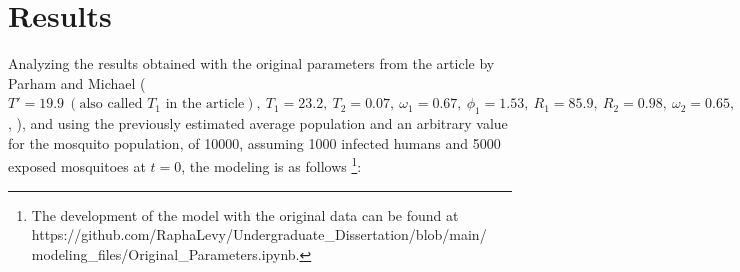 \chapter{Results}


Analyzing the results obtained with the original parameters from 
the article by Parham and Michael 
($T' = 19.9 \ (\text{also called $T_1$ in the article}), \ T_1=23.2, \ T_2=0.07, \ \omega_1=0.67, \ \phi_1=1.53, \ R_1=85.9, \ R_2=0.98, 
\ \omega_2=0.65, \ \phi_2=1.99, \ A=-0.03, \ B=1.31, \ C=-4.4, \ b_1=0.04, \ 
b_2 = 0.09, \ T_{min}=14.5, \ \gamma= 1/120, \ R_L = 50, \ c_1=0.00554, \ 
c_2=-0.06737$ \cite{Parham2010}, \cite{OKUNEYE201772}), and using 
the previously estimated average population and an arbitrary value 
for the mosquito population, of 10000, assuming 1000 infected humans and 
5000 exposed mosquitoes at $t=0$, the modeling is as follows
\footnote{The development of the model with the original data can be found at 
https://github.com/RaphaLevy/Undergraduate\_Dissertation/blob/main/
\\modeling\_files/Original\_Parameters.ipynb.}: 







